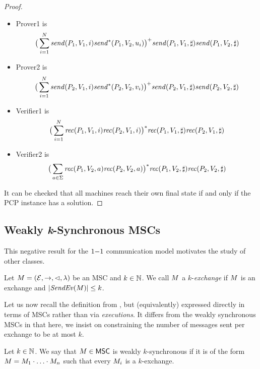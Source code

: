 \documentclass{article}
\begin{document}
\begin{proof}
	\begin{itemize}
	\item Prover1 is $$\big(\sum_{i=1}^N\mathit{send}(P_1, V_1, i)\mathit{send}^*(P_1,V_2,u_i)\big)^+\mathit{send}(P_1, V_1, \sharp)\mathit{send}(P_1, V_2, \sharp)$$
	
	\item Prover2 is $$\big(\sum_{i=1}^N\mathit{send}(P_2, V_1, i)\mathit{send}^*(P_2,V_2,v_i)\big)^+\mathit{send}(P_2, V_1, \sharp)\mathit{send}(P_2, V_2, \sharp)$$
	
	\item Verifier1 is $$\big(\sum_{i=1}^N\mathit{rec}(P_1, V_1, i)\mathit{rec}(P_2, V_1, i)\big)^*\mathit{rec}(P_1, V_1, \sharp)\mathit{rec}(P_2, V_1, \sharp)$$
	
	\item Verifier2 is $$\big(\sum_{a\in\Sigma}\mathit{rec}(P_1, V_2, a)\mathit{rec}(P_2, V_2, a)\big)^*\mathit{rec}(P_1, V_2, \sharp)\mathit{rec}(P_2, V_2, \sharp)$$
	
	\end{itemize}
	
	It can be checked that all machines reach their own final
	state if and only if the PCP instance has a solution.
\end{proof}	

\subsection{Weakly \emph{k}-Synchronous MSCs}\label{sec:weakly-k}

This negative result for the $1\mathsf{-}1$ communication model motivates the study of other classes.

\begin{definition}[$k$-exchange]\label{def:weak-k-synchr}
Let $M = (\mathcal{E},\to,\lhd,\lambda)$ be an MSC
and $k \in \mathbb{N}$.
We call $M$ a $k$-\emph{exchange} if
$M$ is an exchange and $|\mathit{SendEv}(M)| \le k$.
\end{definition}


Let us now recall the definition
from \cite{DBLP:conf/cav/BouajjaniEJQ18,DBLP:conf/fossacs/GiustoLL20}, but (equivalently)
expressed directly in terms of MSCs rather than via \emph{executions}. It differs from the weakly synchronous MSCs in that here, we insist on constraining the number of messages sent per exchange to be at most $k$.

\begin{definition}\label{def:weaksync}
Let $k \in \mathbb{N}$.
We say that $M \in \mathsf{MSC}$ is
weakly $k$-synchronous if it is of the form
$M = M_1 \cdot \ldots \cdot M_n$
such that every $M_i$ is a $k$-exchange.
\end{definition}
\end{document}
